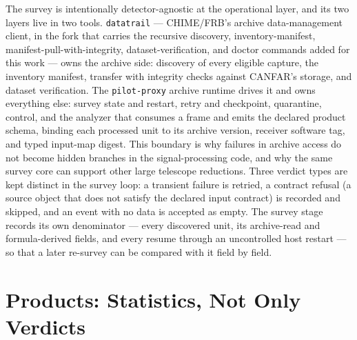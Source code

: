 The survey is intentionally detector-agnostic at the operational layer, and
its two layers live in two tools.  \texttt{datatrail} --- CHIME/FRB's archive
data-management client, in the fork that carries the recursive discovery,
inventory-manifest, manifest-pull-with-integrity, dataset-verification, and
doctor commands added for this work \cite{datatrail-cli} --- owns the archive
side: discovery of every eligible capture, the inventory manifest, transfer
with integrity checks against CANFAR's storage, and dataset verification.  The
\texttt{pilot-proxy} archive runtime drives it and owns everything else:
survey state and restart, retry and checkpoint, quarantine, control, and the
analyzer that consumes a frame and emits the declared product schema, binding
each processed unit to its archive version, receiver software tag, and typed
input-map digest.  This boundary is why failures in
archive access do not become hidden branches in the signal-processing code, and
why the same survey core can support other large telescope reductions.  Three
verdict types are kept distinct in the survey loop: a transient failure is
retried, a contract refusal (a source object that does not satisfy the declared
input contract) is recorded and skipped, and an event with no data is accepted
as empty.  The survey stage records its own denominator --- every discovered
unit, its archive-read and formula-derived fields, and every resume through an
uncontrolled host restart --- so that a later re-survey can be compared with it
field by field.

\section{Products: Statistics, Not Only Verdicts}
\label{sec:survey:products}

